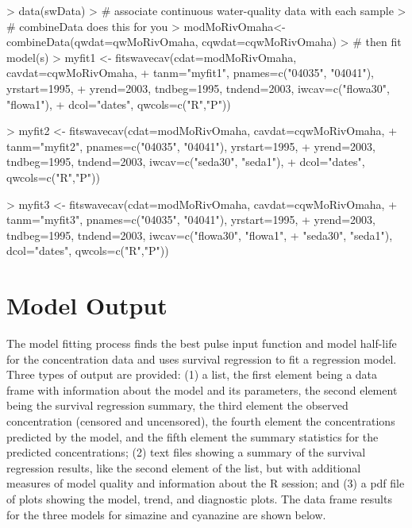 \documentclass[11pt]{article}
\begin{document}
\begin{Schunk}
\begin{Sinput}
> data(swData)
> # associate continuous water-quality data with each sample
> # combineData does this for you
> modMoRivOmaha<-combineData(qwdat=qwMoRivOmaha, cqwdat=cqwMoRivOmaha)
> # then fit model(s)
> myfit1 <- fitswavecav(cdat=modMoRivOmaha, cavdat=cqwMoRivOmaha,
+ tanm="myfit1", pnames=c("04035", "04041"), yrstart=1995,
+ yrend=2003, tndbeg=1995, tndend=2003, iwcav=c("flowa30", "flowa1"),
+ dcol="dates", qwcols=c("R","P"))
\end{Sinput}
\begin{Soutput}

\end{Soutput}
\begin{Sinput}
> myfit2 <- fitswavecav(cdat=modMoRivOmaha, cavdat=cqwMoRivOmaha,
+ tanm="myfit2", pnames=c("04035", "04041"), yrstart=1995,
+ yrend=2003, tndbeg=1995, tndend=2003, iwcav=c("seda30", "seda1"),
+ dcol="dates", qwcols=c("R","P"))
\end{Sinput}
\begin{Soutput}

\end{Soutput}
\begin{Sinput}
> myfit3 <- fitswavecav(cdat=modMoRivOmaha, cavdat=cqwMoRivOmaha,
+ tanm="myfit3", pnames=c("04035", "04041"), yrstart=1995,
+ yrend=2003, tndbeg=1995, tndend=2003, iwcav=c("flowa30", "flowa1",
+ "seda30", "seda1"), dcol="dates", qwcols=c("R","P"))
\end{Sinput}
\begin{Soutput}

\end{Soutput}
\end{Schunk}

\section{Model Output}
The model fitting process finds the best pulse input function and model half-life for the concentration data and uses survival regression to fit a regression model.  Three types of output are provided: (1) a list, the first element being a data frame with information about the model and its parameters, the second element being the survival regression summary, the third element the observed concentration (censored and uncensored), the fourth element the concentrations predicted by the model, and the fifth element the summary statistics for the predicted concentrations; (2) text files showing a summary of the survival regression results, like the second element of the list, but with  additional measures of model quality and information about the R session; and (3) a pdf file of plots showing the model, trend, and diagnostic plots.  The data frame results for the three models for simazine and cyanazine are shown below.
\vspace{5 mm}
\end{document}
